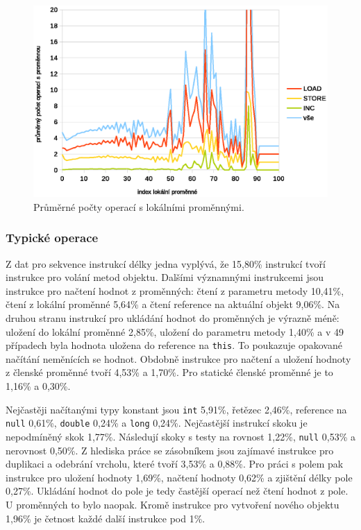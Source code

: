 \begin{figure}[h!]
\centering
\includegraphics[scale=0.9]{fig/locals} 
\caption{Průměrné počty operací s lokálními proměnnými.}\label{vars}
\end{figure}

\subsubsection{Typické operace}

Z dat pro sekvence instrukcí délky jedna vyplývá, že 15,80\% instrukcí tvoří instrukce pro volání metod objektu. Dalšími významnými instrukcemi jsou instrukce pro načtení hodnot z proměnných: čtení z parametru metody 10,41\%, čtení z lokální proměnné 5,64\% a čtení reference na aktuální objekt 9,06\%. Na druhou stranu instrukcí pro ukládání hodnot do proměnných je výrazně méně: uložení do lokální proměnné 2,85\%, uložení do parametru metody 1,40\% a v 49 případech byla hodnota uložena do reference na \texttt{this}. To poukazuje opakované načítání neměnících se hodnot. Obdobně instrukce pro načtení a uložení hodnoty z členské proměnné tvoří 4,53\% a 1,70\%. Pro statické členské proměnné je to 1,16\% a 0,30\%. 

Nejčastěji načítanými typy konstant jsou \texttt{int} 5,91\%, řetězec 2,46\%, reference na \texttt{null} 0,61\%, \texttt{double} 0,24\% a \texttt{long} 0,24\%. Nejčastější instrukcí skoku je nepodmíněný skok 1,77\%. Následují skoky s testy na rovnost 1,22\%, \texttt{null} 0,53\% a nerovnost 0,50\%. Z hlediska práce se zásobníkem jsou zajímavé instrukce pro duplikaci a odebrání vrcholu, které tvoří 3,53\% a 0,88\%. Pro práci s polem pak instrukce pro uložení hodnoty 1,69\%, načtení hodnoty 0,62\% a zjištění délky pole 0,27\%. Ukládání hodnot do pole je tedy častější operací než čtení hodnot z pole. U proměnných to bylo naopak. Kromě instrukce pro vytvoření nového objektu 1,96\% je četnost každé další instrukce pod 1\%. 

